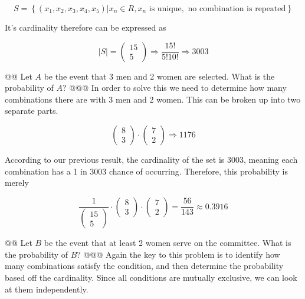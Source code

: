 \documentclass[10pt]{article}
\begin{document}
\begin{easylist}[enumerate]
        \[ S = \left\{ (x_1, x_2, x_3, x_4, x_5) | x_n \in R, x_n \text{ is unique}, \text{ no combination is repeated} \right\} \]

    It's cardinality therefore can be expressed as

        \[ |S| = \begin{pmatrix}15\\5\end{pmatrix} \Rightarrow \frac{15!}{5!10!} \Rightarrow 3003 \]

    @@ Let $A$ be the event that 3 men and 2 women are selected. What is the probability of $A$?
    @@@ In order to solve this we need to determine how many combinations there are with 3 men and 2 women. This can be broken up into two separate parts.

        \[ \begin{pmatrix}8\\3\end{pmatrix} \cdot \begin{pmatrix}7\\2\end{pmatrix} \Rightarrow 1176 \]

        According to our previous result, the cardinality of the set is 3003, meaning each combination has a 1 in 3003 chance of occurring. Therefore, this probability is merely

        \[ \frac{1}{\begin{pmatrix}15\\5\end{pmatrix} } \cdot \begin{pmatrix}8\\3\end{pmatrix} \cdot \begin{pmatrix}7\\2\end{pmatrix} = \boxed{\frac{56}{143} \approx 0.3916} \]

    @@ Let $B$ be the event that at least 2 women serve on the committee. What is the probability of $B$?
    @@@ Again the key to this problem is to identify how many combinations satisfy the condition, and then determine the probability based off the cardinality. Since all conditions are mutually exclusive, we can look at them independently.


\end{easylist}
\end{document}
